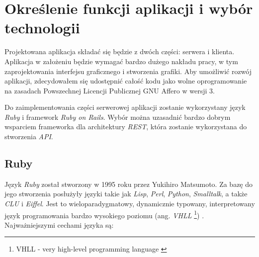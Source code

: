 \documentclass[a4paper,12pt]{article}
\begin{document}
\clearpage

\section{Określenie funkcji aplikacji i wybór technologii}
Projektowana aplikacja składać się będzie z dwóch części: serwera i
klienta. Aplikacja w założeniu będzie wymagać bardzo dużego nakładu
pracy, w tym zaprojektowania interfejsu graficznego i stworzenia
grafiki. Aby umożliwić rozwój aplikacji, zdecydowałem się udostępnić
całość kodu jako wolne oprogramowanie na zasadach Powszechnej Licencji
Publicznej GNU Affero w wersji 3\cite{affero}.

Do zaimplementowania części serwerowej aplikacji zostanie wykorzystany
język \emph{Ruby} i framework \emph{Ruby on Rails}. Wybór można
uzasadnić bardzo dobrym wsparciem frameworka dla architektury
\emph{REST}, która zostanie wykorzystana do stworzenia \emph{API}.

\subsection{Ruby}
Język \emph{Ruby} został stworzony w 1995 roku przez Yukihiro
Matsumoto. Za bazę do jego stworzenia posłużyły języki takie jak
\emph{Lisp}, \emph{Perl}, \emph{Python}, \emph{Smalltalk}, a także
\emph{CLU} i \emph{Eiffel}. Jest to wieloparadygmatowy, dynamicznie
typowany, interpretowany język programowania bardzo wysokiego poziomu
(ang. \emph{VHLL} \footnote{VHLL - very high-level programming language
  \cite{vhll} }) \cite{ruby}. Najważniejszymi cechami języka są:
\end{document}
